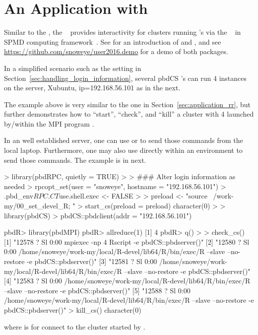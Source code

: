 
\section[An Application with \pkg{pbdCS}]{An Application with }
\label{sec:application_cs}

Similar to the , the ~\citep{pbdCS} provides
interactivity for clusters running 's via the
~\citep{Chen2012pbdMPIpackage} in SPMD computing
framework~\citep{pbdR2012,hpsc2012}.
See \citet{xsede16} for an introduction of  and , and
see \url{https://github.com/snoweye/user2016.demo}
for a demo of both packages.

In a simplified scenario such as the setting in
Section~\ref{sec:handling_login_information},
several pbdCS 's can run 4 instances on the server,
Xubuntu, ip=192.168.56.101 as in the next.
The example above is very similar to the one in
Section~\ref{sec:application_rr}, but further demonstrates
how to ``start'', ``check'', and ``kill''
a  cluster with 4  launched by/within
the MPI program .

In an well established server, one can use  or 
to send those commands from the local laptop.
Furthermore, one may also use  directly within an 
environment to send those commands. The example is in next.
\begin{Code}[title=Using \pkg{pbdRPC} to control \pkg{pbdCS}]
> library(pbdRPC, quietly = TRUE)
>
> ### Alter login information as needed
> rpcopt_set(user = "snoweye", hostname = "192.168.56.101")
> .pbd_env$RPC.CT$use.shell.exec <- FALSE
>
> preload <- "source ~/work-my/00_set_devel_R; "
> start_cs(preload = preload)
character(0)
>
> library(pbdCS)
> pbdCS::pbdclient(addr = "192.168.56.101")

pbdR> library(pbdMPI)
pbdR> allreduce(1)
[1] 4 
pbdR> q()
>
> check_cs()
[1] "12578 ?        Sl     0:00 mpiexec -np 4 Rscript -e pbdCS::pbdserver()"                                                      
[2] "12580 ?        Sl     0:00 /home/snoweye/work-my/local/R-devel/lib64/R/bin/exec/R --slave --no-restore -e pbdCS::pbdserver()"
[3] "12581 ?        Sl     0:00 /home/snoweye/work-my/local/R-devel/lib64/R/bin/exec/R --slave --no-restore -e pbdCS::pbdserver()"
[4] "12583 ?        Sl     0:00 /home/snoweye/work-my/local/R-devel/lib64/R/bin/exec/R --slave --no-restore -e pbdCS::pbdserver()"
[5] "12588 ?        Sl     0:00 /home/snoweye/work-my/local/R-devel/lib64/R/bin/exec/R --slave --no-restore -e pbdCS::pbdserver()"
> kill_cs()
character(0)
\end{Code}
where  is for connect to the  cluster
started by .

